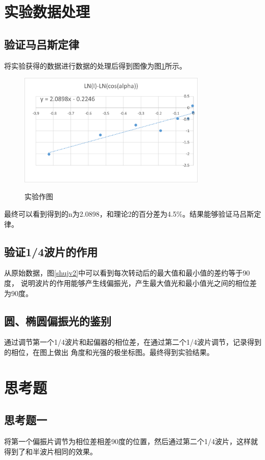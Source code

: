 \documentclass{ctexart}
\begin{document}
\section{实验数据处理}
  \subsection{验证马吕斯定律}
  将实验获得的数据进行数据的处理后得到图像为图\ref{shiyanzuotu}所示。
  \begin{figure}[H]
    \centering \label{shiyanzuotu}
    \includegraphics[width=0.8\textwidth,height=0.4\textheight]{zuotu.png}
    \caption{实验作图}
  \end{figure}

  最终可以看到得到的n为2.0898，和理论2的百分差为4.5\%。结果能够验证马吕斯定律。

  \subsection{验证1/4波片的作用}
  从原始数据，图\ref{shujv2}中可以看到每次转动后的最大值和最小值的差约等于90度，
  说明波片的作用能够产生线偏振光，产生最大值光和最小值光之间的相位差为90度。

  \subsection{圆、椭圆偏振光的鉴别}
  通过调节第一个1/4波片和起偏器的相位差，在通过第二个1/4波片调节，记录得到的相位，在图上做出
  角度和光强的极坐标图。最终得到实验结果。
\section{思考题}
  \subsection{思考题一}
  将第一个偏振片调节为相位差相差90度的位置，然后通过第二个1/4波片，这样就得到了和半波片相同的效果。
\end{document}

